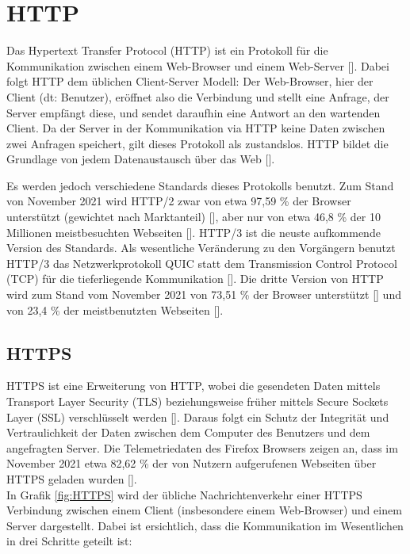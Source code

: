 \section{HTTP}
\label{sec:http}

Das Hypertext Transfer Protocol (HTTP) ist ein Protokoll für die Kommunikation zwischen einem Web-Browser und einem Web-Server [\cite{http}]. Dabei folgt HTTP dem üblichen Client-Server Modell: Der Web-Browser, hier der Client (dt: Benutzer), eröffnet also die Verbindung und stellt eine Anfrage, der Server empfängt diese, und sendet daraufhin eine Antwort an den wartenden Client. Da der Server in der Kommunikation via HTTP keine Daten zwischen zwei Anfragen speichert, gilt dieses Protokoll als zustandslos. HTTP bildet die Grundlage von jedem Datenaustausch über das Web [\cite{httpUsage}].

Es werden jedoch verschiedene Standards dieses Protokolls benutzt. Zum Stand von November 2021 wird HTTP/2 zwar von etwa 97,59 \% der Browser unterstützt (gewichtet nach Marktanteil) [\cite{http2Browser}], aber nur von etwa 46,8 \% der 10 Millionen meistbesuchten Webseiten [\cite{http2Website}]. HTTP/3 ist die neuste aufkommende Version des Standards. Als wesentliche Veränderung zu den Vorgängern benutzt HTTP/3 das Netzwerkprotokoll QUIC statt dem Transmission Control Protocol (TCP) für die tieferliegende Kommunikation [\cite{http3}]. Die dritte Version von HTTP wird zum Stand vom November 2021 von 73,51 \% der Browser unterstützt [\cite{http3Browser}] und von 23,4 \% der meistbenutzten Webseiten [\cite{http3Website}].

\subsection{HTTPS}
\label{subsec:http_https}

HTTPS ist eine Erweiterung von HTTP, wobei die gesendeten Daten mittels Transport Layer Security (TLS) beziehungsweise früher mittels Secure Sockets Layer (SSL) verschlüsselt werden [\cite{https}]. Daraus folgt ein Schutz der Integrität und Vertraulichkeit der Daten zwischen dem Computer des Benutzers und dem angefragten Server. Die Telemetriedaten des Firefox Browsers zeigen an, dass im November 2021 etwa 82,62 \% der von Nutzern aufgerufenen Webseiten über HTTPS geladen wurden [\cite{httpsUsage}].\\
In Grafik \ref{fig:HTTPS} wird der übliche Nachrichtenverkehr einer HTTPS Verbindung zwischen einem Client (insbesondere einem Web-Browser) und einem Server dargestellt. Dabei ist ersichtlich, dass die Kommunikation im Wesentlichen in drei Schritte geteilt ist:

